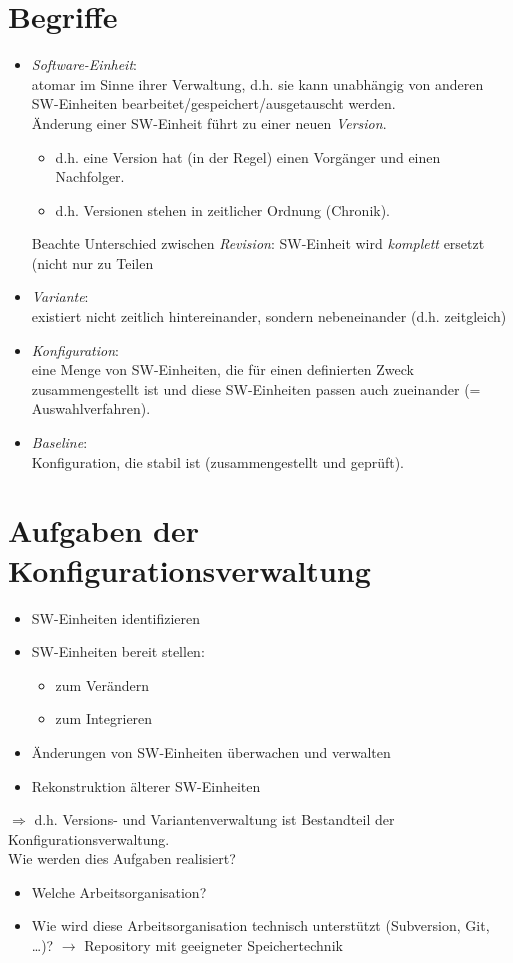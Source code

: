 \section{Begriffe}
\begin{itemize}
\item \emph{Software-Einheit}:\\
atomar im Sinne ihrer Verwaltung, d.h. sie kann unabhängig von anderen SW-Einheiten bearbeitet/gespeichert/ausgetauscht werden.\\
Änderung einer SW-Einheit führt zu einer neuen \emph{Version}.
\begin{itemize}[label=$\rightarrow$]
\item d.h. eine Version hat (in der Regel) einen Vorgänger und einen Nachfolger.
\item d.h. Versionen stehen in zeitlicher Ordnung (Chronik).
\end{itemize}
Beachte Unterschied zwischen \emph{Revision}: SW-Einheit wird \emph{komplett} ersetzt (nicht nur zu Teilen
\item \emph{Variante}:\\
existiert nicht zeitlich hintereinander, sondern nebeneinander (d.h. zeitgleich)
\item \emph{Konfiguration}:\\
eine Menge von SW-Einheiten, die für einen definierten Zweck zusammengestellt ist und diese SW-Einheiten passen auch zueinander (= Auswahlverfahren).
\item \emph{Baseline}:\\
Konfiguration, die stabil ist (zusammengestellt und geprüft).
\end{itemize}

\section{Aufgaben der Konfigurationsverwaltung}
\begin{itemize}
\item SW-Einheiten identifizieren
\item SW-Einheiten bereit stellen:
\begin{itemize}
\item zum Verändern
\item zum Integrieren
\end{itemize}
\item Änderungen von SW-Einheiten überwachen und verwalten
\item Rekonstruktion älterer SW-Einheiten
\end{itemize}
$\Rightarrow$ d.h. Versions- und Variantenverwaltung ist Bestandteil der Konfigurationsverwaltung.\\
Wie werden dies Aufgaben realisiert?
\begin{itemize}
\item Welche Arbeitsorganisation?
\item Wie wird diese Arbeitsorganisation technisch unterstützt (Subversion, Git, …)? $\to$ Repository mit geeigneter Speichertechnik
\end{itemize}

